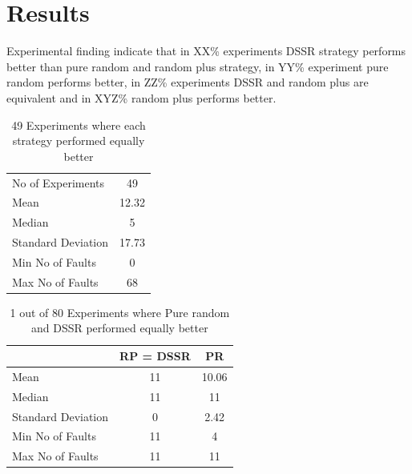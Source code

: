 \documentclass[conference]{IEEEtran}
\begin{document}

\section{Results}
Experimental finding indicate that in XX\% experiments DSSR strategy performs better than pure random and random plus strategy, in YY\% experiment pure random performs better, in ZZ\% experiments DSSR and random plus are equivalent and in XYZ\% random plus performs better. 





\begin{table}[H]
\caption{49 Experiments where each strategy performed equally better}
\centering
\begin{tabular}{|l|c|}
\hline\hline
No of Experiments 	& 49  	\\
Mean  			& 12.32  	\\
Median 			& 5 		\\
Standard Deviation 	& 17.73  	\\
Min No of Faults	&  0  		\\
Max No of Faults 	& 68  	\\
\hline
\end{tabular}
\label{table:nonlin}
\end{table}





\begin{table}[H]
\caption{1 out of 80 Experiments where Pure random and DSSR performed equally better}
\centering
\begin{tabular}{|l|c|c|}
\hline\hline
 				& RP = DSSR			&  PR \\[1ex]
\hline
Mean  			&    11				&  10.06\\
Median 			&    11 				&  11\\
Standard Deviation 	&    0					&  2.42\\
Min No of Faults	&    11				&  4\\
Max No of Faults 	&    11				&  11\\
\hline
\end{tabular}
\label{table:result5}
\end{table}




\end{document}
